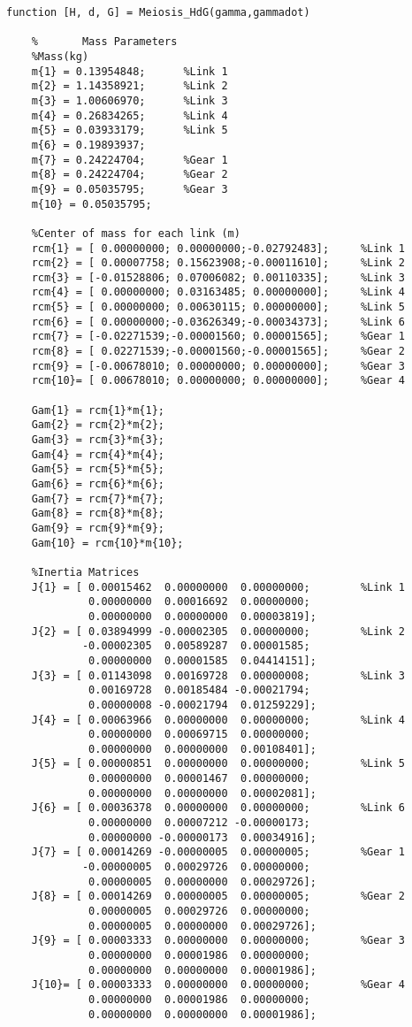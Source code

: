 \begin{lstlisting}[frame=lines,style=Matlab-editor,basicstyle = \mlttfamily, caption={H, D, and G Calculations}]
function [H, d, G] = Meiosis_HdG(gamma,gammadot)

    %       Mass Parameters
    %Mass(kg)
    m{1} = 0.13954848;      %Link 1
    m{2} = 1.14358921;      %Link 2
    m{3} = 1.00606970;      %Link 3
    m{4} = 0.26834265;      %Link 4
    m{5} = 0.03933179;      %Link 5
    m{6} = 0.19893937;
    m{7} = 0.24224704;      %Gear 1
    m{8} = 0.24224704;      %Gear 2
    m{9} = 0.05035795;      %Gear 3
    m{10} = 0.05035795;

    %Center of mass for each link (m)
    rcm{1} = [ 0.00000000; 0.00000000;-0.02792483];     %Link 1
    rcm{2} = [ 0.00007758; 0.15623908;-0.00011610];     %Link 2
    rcm{3} = [-0.01528806; 0.07006082; 0.00110335];     %Link 3
    rcm{4} = [ 0.00000000; 0.03163485; 0.00000000];     %Link 4
    rcm{5} = [ 0.00000000; 0.00630115; 0.00000000];     %Link 5
    rcm{6} = [ 0.00000000;-0.03626349;-0.00034373];     %Link 6
    rcm{7} = [-0.02271539;-0.00001560; 0.00001565];     %Gear 1
    rcm{8} = [ 0.02271539;-0.00001560;-0.00001565];     %Gear 2
    rcm{9} = [-0.00678010; 0.00000000; 0.00000000];     %Gear 3
    rcm{10}= [ 0.00678010; 0.00000000; 0.00000000];     %Gear 4

    Gam{1} = rcm{1}*m{1};
    Gam{2} = rcm{2}*m{2};
    Gam{3} = rcm{3}*m{3};
    Gam{4} = rcm{4}*m{4};
    Gam{5} = rcm{5}*m{5};
    Gam{6} = rcm{6}*m{6};
    Gam{7} = rcm{7}*m{7};
    Gam{8} = rcm{8}*m{8};
    Gam{9} = rcm{9}*m{9};
    Gam{10} = rcm{10}*m{10};

    %Inertia Matrices
	J{1} = [ 0.00015462  0.00000000  0.00000000;        %Link 1
	         0.00000000	 0.00016692  0.00000000;
	         0.00000000	 0.00000000  0.00003819];
    J{2} = [ 0.03894999 -0.00002305  0.00000000;        %Link 2
            -0.00002305  0.00589287  0.00001585;
             0.00000000  0.00001585  0.04414151];
    J{3} = [ 0.01143098  0.00169728  0.00000008;        %Link 3
	         0.00169728	 0.00185484 -0.00021794;
	         0.00000008	-0.00021794  0.01259229];
    J{4} = [ 0.00063966  0.00000000  0.00000000;        %Link 4
	         0.00000000	 0.00069715  0.00000000;
	         0.00000000	 0.00000000  0.00108401];
    J{5} = [ 0.00000851  0.00000000  0.00000000;        %Link 5
	         0.00000000	 0.00001467  0.00000000;
	         0.00000000	 0.00000000  0.00002081];
    J{6} = [ 0.00036378  0.00000000  0.00000000;        %Link 6
	         0.00000000	 0.00007212 -0.00000173;
	         0.00000000	-0.00000173  0.00034916];
    J{7} = [ 0.00014269 -0.00000005  0.00000005;        %Gear 1
	        -0.00000005	 0.00029726  0.00000000;
	         0.00000005	 0.00000000  0.00029726];
    J{8} = [ 0.00014269  0.00000005  0.00000005;        %Gear 2
	         0.00000005	 0.00029726  0.00000000;
	         0.00000005	 0.00000000  0.00029726];
    J{9} = [ 0.00003333  0.00000000  0.00000000;        %Gear 3
	         0.00000000	 0.00001986  0.00000000;
	         0.00000000	 0.00000000  0.00001986];
    J{10}= [ 0.00003333  0.00000000  0.00000000;        %Gear 4
	         0.00000000	 0.00001986  0.00000000;
	         0.00000000	 0.00000000  0.00001986];



\end{lstlisting}
